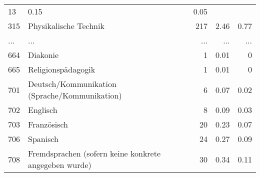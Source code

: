 \begin{longtable}{lXrrr}
          \num{13} &
          \num[round-mode=places,round-precision=2]{0.15} &
          \num[round-mode=places,round-precision=2]{0.05} \\
        315 & \multicolumn{1}{X}{Physikalische Technik} & %
          \num{217} &
          \num[round-mode=places,round-precision=2]{2.46} &
          \num[round-mode=places,round-precision=2]{0.77} \\
       ... & ... & ... & ... & ... \\
        664 & \multicolumn{1}{X}{Diakonie} & %
          \num{1} &
          \num[round-mode=places,round-precision=2]{0.01} &
          \num[round-mode=places,round-precision=2]{0} \\

        665 & \multicolumn{1}{X}{Religionspädagogik} & %
          \num{1} &
          \num[round-mode=places,round-precision=2]{0.01} &
          \num[round-mode=places,round-precision=2]{0} \\

        701 & \multicolumn{1}{X}{Deutsch/Kommunikation (Sprache/Kommunikation)} & %
          \num{6} &
          \num[round-mode=places,round-precision=2]{0.07} &
          \num[round-mode=places,round-precision=2]{0.02} \\

        702 & \multicolumn{1}{X}{Englisch} & %
          \num{8} &
          \num[round-mode=places,round-precision=2]{0.09} &
          \num[round-mode=places,round-precision=2]{0.03} \\

        703 & \multicolumn{1}{X}{Französisch} & %
          \num{20} &
          \num[round-mode=places,round-precision=2]{0.23} &
          \num[round-mode=places,round-precision=2]{0.07} \\

        706 & \multicolumn{1}{X}{Spanisch} & %
          \num{24} &
          \num[round-mode=places,round-precision=2]{0.27} &
          \num[round-mode=places,round-precision=2]{0.09} \\

        708 & \multicolumn{1}{X}{Fremdsprachen (sofern keine konkrete angegeben wurde)} & %
          \num{30} &
          \num[round-mode=places,round-precision=2]{0.34} &
          \num[round-mode=places,round-precision=2]{0.11} \\


\end{longtable}
